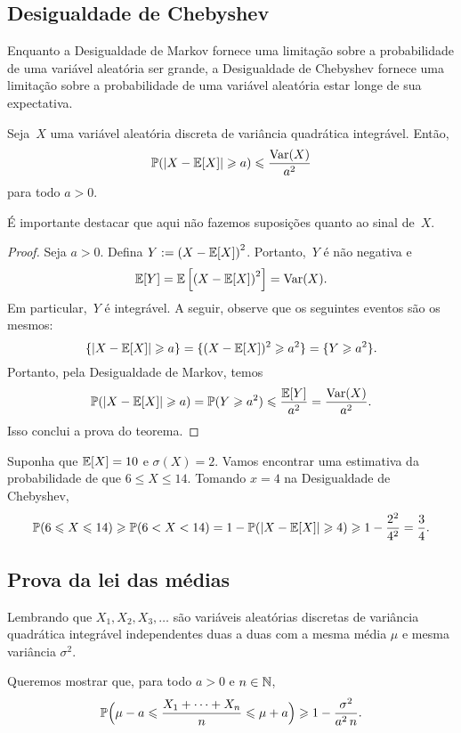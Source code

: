 \subsection{Desigualdade de Chebyshev}
\label{sub:chebyshev}

Enquanto a Desigualdade de Markov fornece uma limitação sobre a probabilidade de uma variável aleatória ser grande, a Desigualdade de Chebyshev fornece uma limitação sobre a probabilidade de uma variável aleatória estar longe de sua expectativa.

\begin{theorem}
Seja~$X$ uma variável aleatória discreta de variância quadrática integrável.
Então,
\[
\mathbb{P}(|X - \mathbb{E}[X]| \geqslant a) \leqslant \frac{\mathrm{Var} (X)}{a^2}
\]
para todo $ a>0 $.
\end{theorem}
É importante destacar que aqui não fazemos suposições quanto ao sinal de~$X$.
\begin{proof}
Seja $ a>0 $.
Defina $Y:= \left(X-\mathbb{E}[X]\right)^2$. Portanto,~$Y$ é não negativa e
\[
\mathbb{E}[Y] = \mathbb{E}\left[\left(X-\mathbb{E}[X]\right)^2\right] = \mathrm{Var} (X).
\]
Em particular,~$Y$ é integrável.
A seguir, observe que os seguintes eventos são os mesmos:
\[
\{|X-\mathbb{E}[X]| \geqslant a\} = \{(X-\mathbb{E}[X])^2 \geqslant a^2\} = \{Y \geqslant a^2\}.
\]
Portanto, pela Desigualdade de Markov, temos
\[
\mathbb{P}(|X -\mathbb{E}[X]| \geqslant a) = \mathbb{P}(Y \geqslant a^2) \leqslant \frac{\mathbb{E}[Y]}{a^2} = \frac{\mathrm{Var} (X)}{a^2}
.
\]
Isso conclui a prova do teorema.
\end{proof}

\begin{example}
Suponha que $ \mathbb{E}[X] = 10 $ e $ \sigma(X)=2 $.
Vamos encontrar uma estimativa da probabilidade de que $ 6 \leq X \leq 14 $.
Tomando $ x=4 $ na Desigualdade de Chebyshev,
\[
\mathbb{P}( 6 \leqslant X \leqslant 14 )
\geqslant
\mathbb{P}( 6 < X < 14 )
=
1 - \mathbb{P}( |X-\mathbb{E}[X]| \geqslant 4 )
\geqslant
1 - \frac{2^2}{4^2}
= \frac{3}{4}
.
\]
\end{example}

\subsection{Prova da lei das médias}
\label{sub:prooflln}

Lembrando que $ X_1, X_2, X_3, \dots $ são variáveis aleatórias discretas de variância quadrática integrável independentes duas a duas com a mesma média $ \mu $ e mesma variância $ \sigma^2 $.

Queremos mostrar que, para todo $ a>0 $ e $ n \in \mathbb{N} $,
\[
\mathbb{P}\Big( \mu-a \leqslant \frac{X_1+\dots+X_n}{n} \leqslant \mu+a \Big)
\geqslant
1 - \frac{\sigma^2}{a^2\, n}
.
\]

